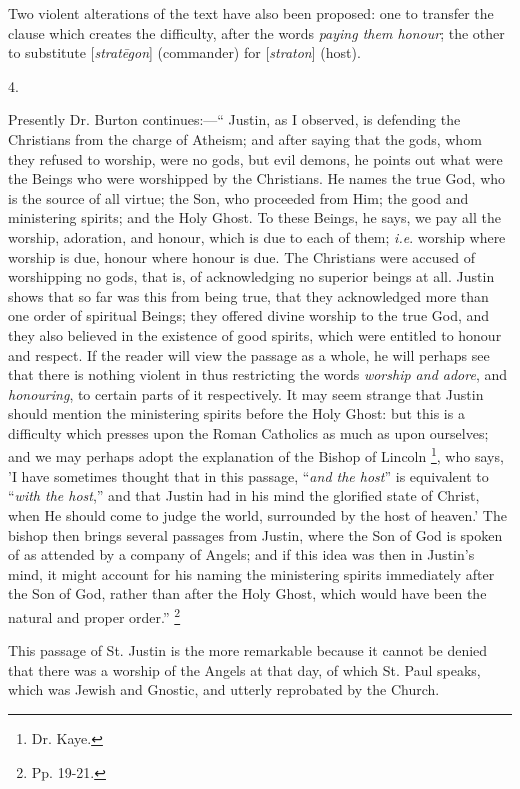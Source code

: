 Two violent alterations of the text have also been proposed: one to
transfer the clause which creates the difficulty, after the words \emph{paying
them honour}; the other to substitute [\emph{strat\={e}gon}]
(commander) for [\emph{straton}] (host).

4.

Presently Dr. Burton continues:—`` Justin, as I observed, is
defending the Christians from the charge of Atheism; and after saying
that the gods, whom they refused to worship, were no gods, but evil
demons, he points out what were the Beings who were worshipped by the
Christians. He names the true God, who is the source of all virtue;
the Son, who proceeded from Him; the good and ministering spirits; and
the Holy Ghost. To these Beings, he says, we pay all the worship,
adoration, and honour, which is due to each of them; \emph{i.e}.
worship where worship is due, honour where honour is due. The
Christians were accused of worshipping no gods, that is, of
acknowledging no superior beings at all. Justin shows that so far was
this from being true, that they acknowledged more than one order of
spiritual Beings; they offered divine worship to the true God, and
they also believed in the existence of good spirits, which were
entitled to honour and respect. If the reader will view the passage as
a whole, he will perhaps see that there is nothing violent in thus
restricting the words \emph{worship and adore}, and \emph{honouring},
to certain parts of it respectively. It may seem strange that Justin
should mention the ministering spirits before the Holy Ghost: but this
is a difficulty which presses upon the Roman Catholics as much as upon
ourselves; and we may perhaps adopt the explanation of the Bishop of
Lincoln \footnote{Dr. Kaye.}, who says, 'I
have sometimes thought that in this passage, ``\emph{and the host}''
is equivalent to ``\emph{with the host},'' and that Justin had
in his mind the glorified state of Christ, when He should come to
judge the world, surrounded by the host of heaven.' The bishop then
brings several passages from Justin, where the Son of God is spoken of
as attended by a company of Angels; and if this idea was then in
Justin's mind, it might account for his naming the ministering spirits
immediately after the Son of God, rather than after the Holy Ghost,
which would have been the natural and proper order.'' \footnote{Pp. 19-21.}

This passage of St. Justin is the more remarkable because it cannot
be denied that there was a worship of the Angels at that day, of which
St. Paul speaks, which was Jewish and Gnostic, and utterly reprobated
by the Church.


